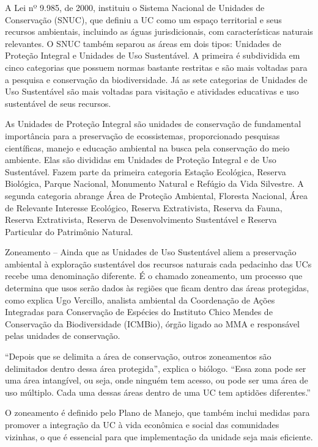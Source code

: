 \documentclass[
  letterpaper,
]{report}
\begin{document}
A Lei nº 9.985, de 2000, instituiu o Sistema Nacional de Unidades de
Conservação (SNUC), que definiu a UC como um espaço territorial e seus
recursos ambientais, incluindo as águas jurisdicionais, com
características naturais relevantes. O SNUC também separou as áreas em
dois tipos: Unidades de Proteção Integral e Unidades de Uso Sustentável.
A primeira é subdividida em cinco categorias que possuem normas bastante
restritas e são mais voltadas para a pesquisa e conservação da
biodiversidade. Já as sete categorias de Unidades de Uso Sustentável são
mais voltadas para visitação e atividades educativas e uso sustentável
de seus recursos.

As Unidades de Proteção Integral são unidades de conservação de
fundamental importância para a preservação de ecossistemas,
proporcionado pesquisas científicas, manejo e educação ambiental na
busca pela conservação do meio ambiente. Elas são divididas em Unidades
de Proteção Integral e de Uso Sustentável. Fazem parte da primeira
categoria Estação Ecológica, Reserva Biológica, Parque Nacional,
Monumento Natural e Refúgio da Vida Silvestre. A segunda categoria
abrange Área de Proteção Ambiental, Floresta Nacional, Área de Relevante
Interesse Ecológico, Reserva Extrativista, Reserva da Fauna, Reserva
Extrativista, Reserva de Desenvolvimento Sustentável e Reserva
Particular do Patrimônio Natural.

Zoneamento -- Ainda que as Unidades de Uso Sustentável aliem a
preservação ambiental à exploração sustentável dos recursos naturais
cada pedacinho das UCs recebe uma denominação diferente. É o chamado
zoneamento, um processo que determina que usos serão dados às regiões
que ficam dentro das áreas protegidas, como explica Ugo Vercillo,
analista ambiental da Coordenação de Ações Integradas para Conservação
de Espécies do Instituto Chico Mendes de Conservação da Biodiversidade
(ICMBio), órgão ligado ao MMA e responsável pelas unidades de
conservação.

``Depois que se delimita a área de conservação, outros zoneamentos são
delimitados dentro dessa área protegida'', explica o biólogo. ``Essa
zona pode ser uma área intangível, ou seja, onde ninguém tem acesso, ou
pode ser uma área de uso múltiplo. Cada uma dessas áreas dentro de uma
UC tem aptidões diferentes.''

O zoneamento é definido pelo Plano de Manejo, que também inclui medidas
para promover a integração da UC à vida econômica e social das
comunidades vizinhas, o que é essencial para que implementação da
unidade seja mais eficiente.
\end{document}
